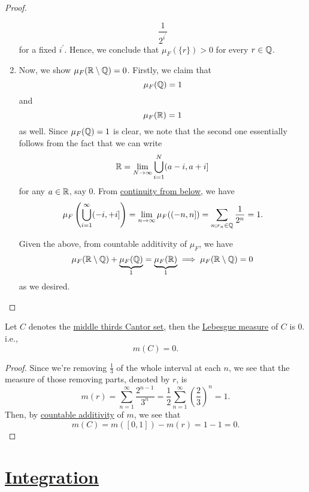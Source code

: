 \begin{proof}
\begin{enumerate}[(1)]
		      \[
			      \frac{1}{2^{i ^\prime }}
		      \]
		      for a fixed \(i ^\prime \). Hence, we conclude that \(\mu _{F}(\{r\}) > 0\) for every \(r\in\mathbb{\MakeUppercase{q}} \).
		\item Now, we show \(\mu _{F}(\mathbb{\MakeUppercase{r}} \setminus \mathbb{\MakeUppercase{q}} ) = 0\). Firstly, we claim that
		      \[
			      \mu _{F}(\mathbb{\MakeUppercase{q}} ) = 1
		      \]
		      and
		      \[
			      \mu _{F}(\mathbb{\MakeUppercase{r}} ) = 1
		      \]
		      as well. Since \(\mu _{F}(\mathbb{\MakeUppercase{q}} ) = 1\) is clear, we note that the second one essentially follows from the fact that we can write
		      \[
			      \mathbb{\MakeUppercase{r}} = \lim\limits_{N \to \infty} \bigcup\limits_{i=1}^{N} (a-i, a+i]
		      \]
		      for any \(a\in\mathbb{\MakeUppercase{r}} \), say \(0\). From \hyperref[thm:measure-space-continuity-from-below]{continuity from below}, we have
		      \[
			      \mu _{F}\left(\bigcup\limits_{i=1}^{\infty} (-i, +i]\right) = \lim\limits_{n \to \infty} \mu _{F}((-n, n]) = \sum\limits_{n;r_{n}\in\mathbb{\MakeUppercase{q}} }\frac{1}{2^n} = 1.
		      \]

		      \par Given the above, from countable additivity of \(\mu _{F}\), we have
		      \[
			      \mu _{F}(\mathbb{\MakeUppercase{r}} \setminus \mathbb{\MakeUppercase{q}} ) + \underbrace{\mu _{F}(\mathbb{\MakeUppercase{q}} )}_{1} = \underbrace{\mu _{F}(\mathbb{\MakeUppercase{r}} )}_{1} \implies \mu _{F}(\mathbb{\MakeUppercase{r}} \setminus \mathbb{\MakeUppercase{q}} ) = 0
		      \]
		      as we desired.
	\end{enumerate}
\end{proof}

\begin{lemma}\label{lma:Cantor-set-has-measure-0}
	Let \(C\) denotes the \hyperref[eg:lec8:Cantor-set]{middle thirds Cantor set}, then the \hyperref[def:Lebesgue-measure]{Lebesgue measure} of \(C\) is \(0\). i.e.,
	\[
		m(C) = 0.
	\]
\end{lemma}
\begin{proof}
	Since we're removing \(\frac{1}{3}\) of the whole interval at each \(n\), we see that the measure of those removing parts, denoted by \(r\), is
	\[
		m(r) = \sum\limits_{n=1}^{\infty} \frac{2^{n-1}}{3^n} = \frac{1}{2}\sum\limits_{n=1}^{\infty} \left(\frac{2}{3}\right)^n = 1.
	\]
	Then, by \hyperref[def:measure]{countable additivity} of \(m\), we see that
	\[
		m(C) = m([0, 1]) - m(r) = 1 - 1 = 0.
	\]
\end{proof}

\section{\hyperref[ch:Integration]{Integration}}
